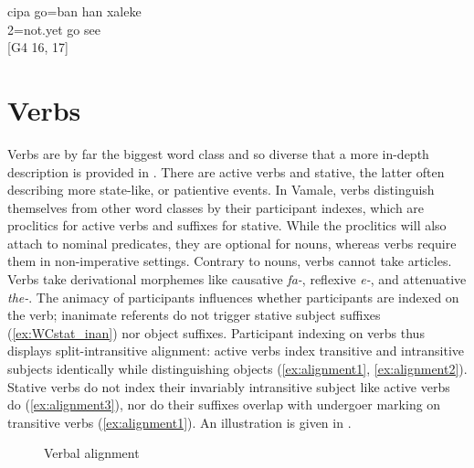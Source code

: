 %
%
%
%
%
%

\ea \label{ex:ban1}
\gll cipa go=ban han xaleke\\
  2=not.yet go see\\
\glt {} {[G4 16, 17]}
%
%
%
%
%
\z

\section{Verbs}%
\label{sec:WCVerbs}
Verbs are by far the biggest word class and so diverse that a more in-depth description is provided in . 
There are active verbs and stative, the latter often describing more state-like, or patientive events. In Vamale, verbs distinguish themselves from other word classes by their participant indexes, which are proclitics for active verbs and suffixes for stative. 
While the proclitics will also attach to nominal predicates, they are optional for nouns, whereas verbs require them in non-imperative settings. Contrary to nouns, verbs cannot take articles. Verbs take derivational morphemes like causative \textit{fa-}, reflexive \textit{e-}, and attenuative \textit{the-}. The animacy of participants influences whether participants are indexed on the verb; inanimate referents do not trigger stative subject suffixes (\ref{ex:WCstat_inan}) nor object suffixes.  %
Participant indexing on verbs thus displays split-intransitive alignment: active verbs index transitive and intransitive subjects identically while distinguishing objects (\ref{ex:alignment1}, \ref{ex:alignment2}). Stative verbs do not index their invariably intransitive subject like active verbs do (\ref{ex:alignment3}), nor do their suffixes overlap with undergoer marking on transitive verbs (\ref{ex:alignment1}). An illustration is given in .

\begin{figure}
\caption{Verbal alignment}
\label{fig:verb_alignment}
\end{figure}


